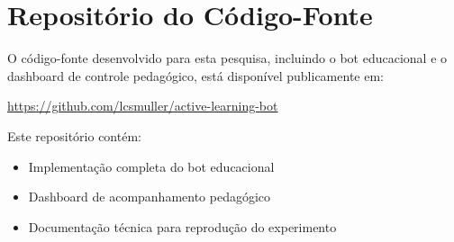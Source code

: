 \chapter{Repositório do Código-Fonte}
\label{appendix:repo}

O código-fonte desenvolvido para esta pesquisa, incluindo o bot educacional e o dashboard de controle pedagógico, está disponível publicamente em:

\begin{center}
\url{https://github.com/lcsmuller/active-learning-bot}
\end{center}

Este repositório contém:
\begin{itemize}
    \item Implementação completa do bot educacional
    \item Dashboard de acompanhamento pedagógico
    \item Documentação técnica para reprodução do experimento
\end{itemize}
